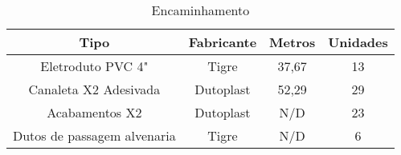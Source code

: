 \begin{table}[h!]
\begin{center}
\caption{Encaminhamento}
\label{tab5}
	\renewcommand{\arraystretch}{1.2}
	\begin{tabular}{|c|c|c|c|}
		\hline
		\textbf{Tipo}       & \textbf{Fabricante} & \multicolumn{1}{l|}{\textbf{Metros}} & \multicolumn{1}{l|}{\textbf{Unidades}} \\ \hline
		Eletroduto PVC 4"         & Tigre               & 37,67                                   & 13                                     \\ \hline
		Canaleta X2 Adesivada         & Dutoplast             & 52,29                                  & 29                                     \\ \hline
		Acabamentos X2 & Dutoplast             & N/D                                  & 23                                     \\ \hline
			Dutos de passagem alvenaria & Tigre             & N/D                                  & 6                                     \\ \hline
	\end{tabular}
    	
\end{center}
\end{table}
